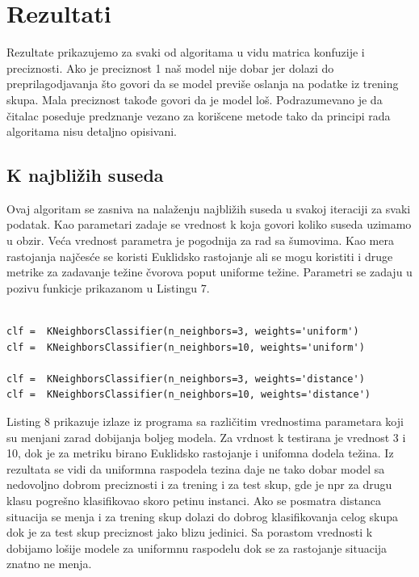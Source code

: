 \documentclass[14pt]{extarticle}
\begin{document}
\section{Rezultati}
\label{Rezultati}
Rezultate prikazujemo za svaki od algoritama u vidu matrica konfuzije i preciznosti. Ako je preciznost 1 naš model nije dobar jer dolazi do preprilagodjavanja što govori da se model previše oslanja na podatke iz trening skupa. Mala preciznost takođe govori da je model loš. Podrazumevano je da čitalac poseduje predznanje vezano za korišcene metode tako da principi rada algoritama nisu detaljno opisivani. \cite{tan} \cite{mk}

\subsection{K najbližih suseda}
\label{subsec:podnaslovM}
Ovaj algoritam se zasniva na nalaženju najbližih suseda u svakoj iteraciji za svaki podatak. Kao parametari zadaje se vrednost k koja govori koliko suseda uzimamo u obzir. Veća vrednost parametra je pogodnija za rad sa šumovima. Kao mera rastojanja najčesće se koristi Euklidsko rastojanje ali se mogu koristiti i druge metrike za zadavanje težine čvorova poput uniforme težine. Parametri se zadaju u pozivu funkicje prikazanom u Listingu 7. 

\begin{lstlisting}[caption={Funkcije KNN},frame=single, label=simple]

clf =  KNeighborsClassifier(n_neighbors=3, weights='uniform')
clf =  KNeighborsClassifier(n_neighbors=10, weights='uniform')

clf =  KNeighborsClassifier(n_neighbors=3, weights='distance')
clf =  KNeighborsClassifier(n_neighbors=10, weights='distance')

\end{lstlisting}

Listing 8 prikazuje izlaze iz programa sa različitim vrednostima parametara koji su menjani zarad dobijanja boljeg modela. Za vrdnost k testirana je vrednost 3 i 10, dok je za metriku birano Euklidsko rastojanje i unifomna dodela težina. Iz rezultata se vidi da uniformna raspodela tezina daje ne tako dobar model sa nedovoljno dobrom preciznosti i za trening i za test skup, gde je npr za drugu klasu pogrešno klasifikovao skoro petinu instanci. Ako se posmatra distanca situacija se menja i za trening skup dolazi do dobrog klasifikovanja celog skupa dok je za test skup preciznost jako blizu jedinici. Sa porastom vrednosti k dobijamo lošije modele za uniformnu raspodelu dok se za rastojanje situacija znatno ne menja.
\end{document}
